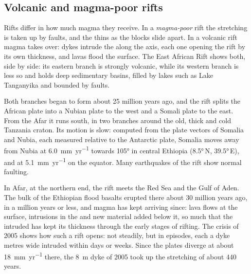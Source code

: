 \subsection*{Volcanic and magma-poor rifts}

Rifts differ in how much magma they receive. In a \emph{magma-poor} rift the
stretching is taken up by faults, and the  thins as the blocks slide
apart. In a volcanic rift magma takes over: dykes intrude the  along the
axis, each one opening the rift by its own thickness, and lavas flood the
surface. The East African Rift shows both, side by side: its eastern branch
is strongly volcanic, while its western branch is less so and holds deep
sedimentary basins, filled by lakes such as Lake Tanganyika and bounded by
faults.

Both branches began to form about 25 million years ago, and the rift splits
the African plate into a Nubian plate to the west and a Somali plate to the
east. From the Afar  it runs south, in two branches around the
old, thick and cold Tanzania craton. Its motion is slow: computed
from the plate vectors of Somalia and Nubia, each measured relative to the
Antarctic plate, Somalia moves away from Nubia at \qty{6.0}{mm.yr^{-1}}
towards \ang{105} in central Ethiopia (\ang{8.5}\,N, \ang{39.5}\,E), and at
\qty{5.1}{mm.yr^{-1}} on the equator. Many earthquakes of the rift show
normal faulting.

In Afar, at the northern end, the rift meets the Red Sea and the Gulf of Aden.
The bulk of the Ethiopian flood basalts erupted there about 30 million years
ago, in a million years or less, and magma has kept arriving since: lava flows
at the surface, intrusions in the  and new material added below it, so
much that the intruded  has kept its thickness through the early stages
of rifting. The crisis of 2005 shows how such a rift opens: not steadily, but
in episodes, each a dyke metres wide intruded within days or weeks. Since the
plates diverge at about \qty{18}{mm.yr^{-1}} there, the \qty{8}{m} dyke of
2005 took up the stretching of about 440 years.

